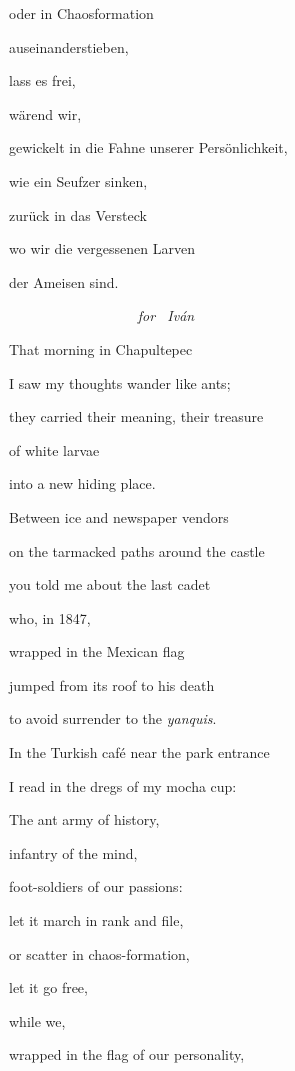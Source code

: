 \documentclass[a4paper]{article}
\begin{document}
oder in Chaosformation

auseinanderstieben,

lass es frei,


\bigskip

wärend wir,

gewickelt in die Fahne unserer Persönlichkeit,

wie ein Seufzer sinken, 

zurück in das Versteck 

wo wir die vergessenen Larven

der Ameisen sind.


{\itshape
\ \ \ \ \ \ \ \ \ \ \ \ \ \ \ \ \ \ for \ Iván}


\bigskip

That morning in Chapultepec

I saw my thoughts wander like ants;

they carried their meaning, their treasure

of white larvae

into a new hiding place.


\bigskip

Between ice and newspaper vendors

on the tarmacked paths around the castle

you told me about the last cadet 

who, in 1847,

wrapped in the Mexican flag

jumped from its roof to his death

to avoid surrender to the \textit{yanquis}.


\bigskip

In the Turkish café near the park entrance

I read in the dregs of my mocha cup:


\bigskip

The ant army of history,

infantry of the mind,

foot-soldiers of our passions:

let it march in rank and file,

or scatter in chaos-formation,

let it go free,


\bigskip

while we,

wrapped in the flag of our personality,
\end{document}
